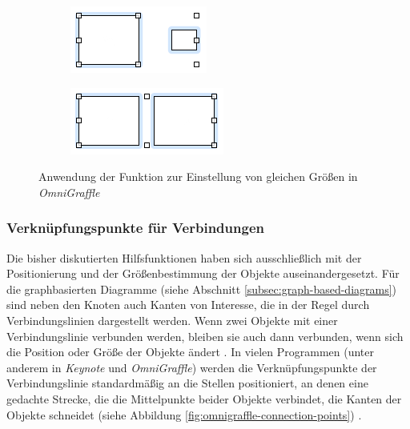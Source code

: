 \begin{figure}[hbt]
    \newcommand{\subfigurewidth}{0.5\textwidth}
    \begin{subfigure}{\subfigurewidth}
        \centering
        \includegraphics{assets/omnigraffle-make-same-size-a}
        \caption{}
        \label{fig:omnigraffle-make-same-size-a}
    \end{subfigure}
    \begin{subfigure}{\subfigurewidth}
        \centering
        \includegraphics{assets/omnigraffle-make-same-size-b}
        \caption{}
        \label{fig:omnigraffle-make-same-size-b}
    \end{subfigure}
    \caption{Anwendung der Funktion zur Einstellung von gleichen Größen in \textit{OmniGraffle}}
    \label{fig:omnigraffle-make-same-size}
\end{figure}

\subsubsection{Verknüpfungspunkte für Verbindungen}
\label{subsubsec:connection-points}

Die bisher diskutierten Hilfsfunktionen haben sich ausschließlich mit der Positionierung und der Größenbestimmung der Objekte auseinandergesetzt. Für die graphbasierten Diagramme (siehe Abschnitt \ref{subsec:graph-based-diagrams}) sind neben den Knoten auch Kanten von Interesse, die in der Regel durch Verbindungslinien dargestellt werden. Wenn zwei Objekte mit einer Verbindungslinie verbunden werden, bleiben sie auch dann verbunden, wenn sich die Position oder Größe der Objekte ändert \cite{11Keynote}. In vielen Programmen (unter anderem in \textit{Keynote} und \textit{OmniGraffle}) werden die Verknüpfungspunkte der Verbindungslinie standardmäßig an die Stellen positioniert, an denen eine gedachte Strecke, die die Mittelpunkte beider Objekte verbindet, die Kanten der Objekte schneidet (siehe Abbildung \ref{fig:omnigraffle-connection-points}) \cite{08OmniGraffle}.

